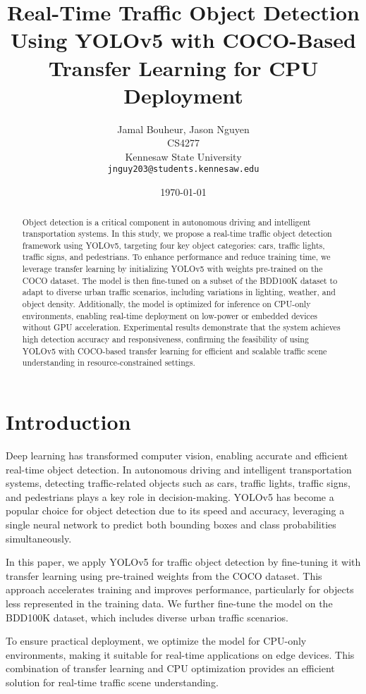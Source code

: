 \documentclass[11pt]{article}  %
\title{Real-Time Traffic Object Detection Using YOLOv5 with COCO-Based Transfer Learning for CPU Deployment}
\author{Jamal Bouheur, Jason Nguyen\\
        CS4277 \\
        Kennesaw State University  \\
        \texttt{jnguy203@students.kennesaw.edu}}
\date{\today}
\begin{document}
\maketitle

\begin{abstract}
Object detection is a critical component in autonomous driving and intelligent transportation systems. In this study, we propose a real-time traffic object detection framework using YOLOv5, targeting four key object categories: cars, traffic lights, traffic signs, and pedestrians. To enhance performance and reduce training time, we leverage transfer learning by initializing YOLOv5 with weights pre-trained on the COCO dataset. The model is then fine-tuned on a subset of the BDD100K dataset to adapt to diverse urban traffic scenarios, including variations in lighting, weather, and object density. Additionally, the model is optimized for inference on CPU-only environments, enabling real-time deployment on low-power or embedded devices without GPU acceleration. Experimental results demonstrate that the system achieves high detection accuracy and responsiveness, confirming the feasibility of using YOLOv5 with COCO-based transfer learning for efficient and scalable traffic scene understanding in resource-constrained settings.
\end{abstract}

\section{Introduction}
Deep learning has transformed computer vision, enabling accurate and efficient real-time object detection. In autonomous driving and intelligent transportation systems, detecting traffic-related objects such as cars, traffic lights, traffic signs, and pedestrians plays a key role in decision-making. YOLOv5 has become a popular choice for object detection due to its speed and accuracy, leveraging a single neural network to predict both bounding boxes and class probabilities simultaneously.

In this paper, we apply YOLOv5 for traffic object detection by fine-tuning it with transfer learning using pre-trained weights from the COCO dataset. This approach accelerates training and improves performance, particularly for objects less represented in the training data. We further fine-tune the model on the BDD100K dataset, which includes diverse urban traffic scenarios.

To ensure practical deployment, we optimize the model for CPU-only environments, making it suitable for real-time applications on edge devices. This combination of transfer learning and CPU optimization provides an efficient solution for real-time traffic scene understanding.
\end{document}
